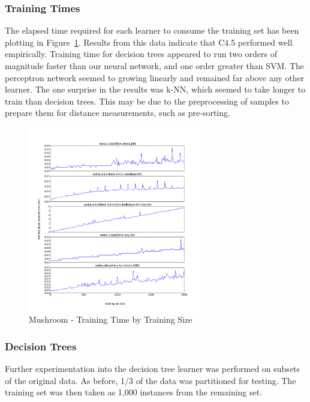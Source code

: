 \documentclass{sig-alternate}
\begin{document}
\subsubsection{Training Times}

The elapsed time required for each learner to consume the training set has been plotting in Figure~\ref{ag-runtime}. Results from this data indicate that C4.5 performed well empirically. Training time for decision trees appeared to run two orders of magnitude faster than our neural network, and one order greater than SVM. The perceptron network seemed to growing linearly and remained far above any other learner. The one surprise in the results was k-NN, which seemed to take longer to train than decision trees. This may be due to the preprocessing of samples to prepare them for distance measurements, such as pre-sorting.


\begin{figure}[!htbp]
    \centering
    \includegraphics[width=3in]{data/agaricus-lepiota/learning-curve-10to2000/runtime.pdf}
    \caption{Mushroom - Training Time by Training Size \label{ag-runtime}}
\end{figure} 


\subsubsection{Decision Trees}

Further experimentation into the decision tree learner was performed on subsets of the original data. As before, 1/3 of the data was partitioned for testing. The training set was then taken as 1,000 instances from the remaining set.
\end{document}
